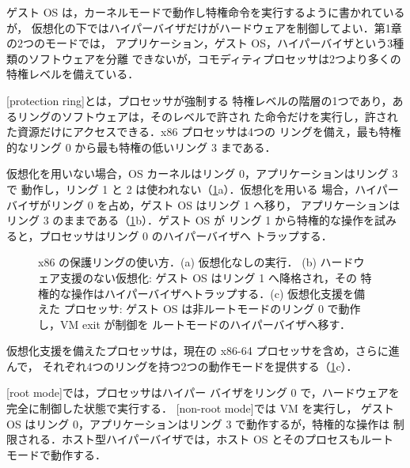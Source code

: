 \documentclass[../main.tex]{subfiles}
\begin{document}
ゲスト OS は，カーネルモードで動作し特権命令を実行するように書かれているが，
仮想化の下ではハイパーバイザだけがハードウェアを制御してよい．第1章の2つのモードでは，
アプリケーション，ゲスト OS，ハイパーバイザという3種類のソフトウェアを分離
できないが，コモディティプロセッサは2つより多くの特権レベルを備えている．

\begin{definition}[保護リング]
  [protection ring]とは，プロセッサが強制する
  特権レベルの階層の1つであり，あるリングのソフトウェアは，そのレベルで許され
  た命令だけを実行し，許された資源だけにアクセスできる．x86 プロセッサは4つの
  リングを備え，最も特権的なリング 0 から最も特権の低いリング 3 まである．
\end{definition}

仮想化を用いない場合，OS カーネルはリング 0，アプリケーションはリング 3 で
動作し，リング 1 と 2 は使われない（\cref{fig:l12-rings}a）．仮想化を用いる
場合，ハイパーバイザがリング 0 を占め，ゲスト OS はリング 1 へ移り，
アプリケーションはリング 3 のままである（\cref{fig:l12-rings}b）．ゲスト OS が
リング 1 から特権的な操作を試みると，プロセッサはリング 0 のハイパーバイザへ
トラップする．

\begin{figure}[htbp]
  \centering
  
  \caption{x86 の保護リングの使い方．(a) 仮想化なしの実行．
    (b) ハードウェア支援のない仮想化: ゲスト OS はリング 1 へ降格され，その
    特権的な操作はハイパーバイザへトラップする．(c) 仮想化支援を備えた
    プロセッサ: ゲスト OS は非ルートモードのリング 0 で動作し，VM exit が制御を
    ルートモードのハイパーバイザへ移す．}
  \label{fig:l12-rings}
\end{figure}

仮想化支援を備えたプロセッサは，現在の x86-64 プロセッサを含め，さらに進んで，
それぞれ4つのリングを持つ2つの動作モードを提供する（\cref{fig:l12-rings}c）．

\begin{definition}[ルートモードと非ルートモード]
  [root mode]では，プロセッサはハイパー
  バイザをリング 0 で，ハードウェアを完全に制御した状態で実行する．
  [non-root mode]では VM を実行し，
  ゲスト OS はリング 0，アプリケーションはリング 3 で動作するが，特権的な操作は
  制限される．ホスト型ハイパーバイザでは，ホスト OS とそのプロセスもルート
  モードで動作する．
\end{definition}
\end{document}
